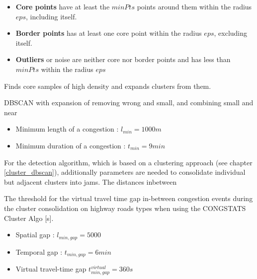 \documentclass[a4paper,12pt]{report}
\begin{document}
\begin{itemize}
	\item \textbf{Core points} have at least the $minPts$ points around them within the radius $eps$, including itself.
    \item \textbf{Border points} has at least one core point within the radius $eps$, excluding itself.
 	\item \textbf{Outliers} or noise are neither core nor border points and has less than $minPts$ within the radius $eps$
\end{itemize}

Finds core samples of high density and expands clusters from them.



DBSCAN with expansion of removing wrong and small, and combining small and near








\begin{itemize}
	\item Minimum length of a congestion : $l_{min} = 1000 m$
	\item Minimum duration of a congestion : $t_{min} = 9 min$
\end{itemize}

For the detection algorithm, which is based on a clustering approach (see chapter \ref{cluster_dbscan}), additionally parameters are needed to consolidate individual but adjacent clusters into jams. The distances inbetween 

The threshold for the virtual travel time gap in-between congestion events during the cluster consolidation on highway roads types when using the CONGSTATS Cluster Algo [s]. 

\begin{itemize}
	\item Spatial gap : $l_{min,gap} = 5000$ %
	\item Temporal gap : $t_{min,gap} = 6 min$ %
	\item Virtual travel-time gap $t_{min,gap}^{virtual} = 360s$
\end{itemize}
\end{document}
